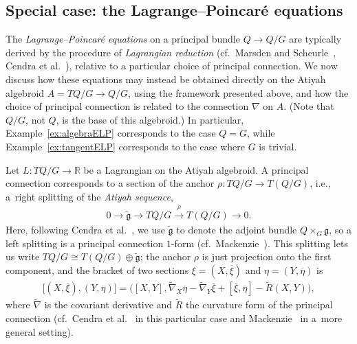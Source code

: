 \documentclass[pdftex]{sigma}
\numberwithin{equation}{section}
\begin{document}
\subsection{Special case: the Lagrange--Poincar\'e equations} \label{sec:lagrangePoincare}

The \emph{Lagrange--Poincar\'e equations} on a principal bundle $ Q \rightarrow Q / G $ are typically derived by the procedure of \emph{Lagrangian reduction} (cf.\ Marsden and Scheurle~\cite{MaSc1993b}, Cendra et al.~\cite{CeMaRa2001}), relative to a particular choice of principal connection. We now discuss how these equations may instead be obtained directly on the Atiyah algebroid $ A = T Q / G \rightarrow Q / G $, using the framework presented above, and how the choice of principal connection is related to the connection $ \nabla $ on $A$. (Note that $ Q / G $, not $Q$, is the base of this algebroid.) In particular,
Example~\ref{ex:algebraELP} corresponds to the case $ Q = G $, while Example~\ref{ex:tangentELP} corresponds to the case where $G$ is trivial.

Let $ L \colon T Q / G \rightarrow \mathbb{R} $ be a Lagrangian on the Atiyah algebroid. A principal connection corresponds to a section of the anchor $ \rho \colon T Q / G \rightarrow T ( Q / G ) $, i.e., a~right splitting of the \emph{Atiyah sequence},
\begin{gather} \label{eqn:atiyahSequence}
 0 \rightarrow \widetilde{ \mathfrak{g} } \rightarrow T Q / G \xrightarrow{ \rho } T ( Q / G ) \rightarrow 0 .
 \end{gather}
Here, following Cendra et al.~\cite{CeMaRa2001}, we use $ \widetilde{ \mathfrak{g} } $ to denote the adjoint bundle $ Q \times _G \mathfrak{g} $, so a left splitting is a principal connection $1$-form (cf.\ Mackenzie~\cite[Chapter~5]{Mackenzie2005}). This splitting lets us write $ T Q / G \cong T ( Q / G ) \oplus \widetilde{ \mathfrak{g} } $; the anchor $\rho$ is just projection onto the f\/irst component, and the bracket of two sections $ \xi = ( X, \overline{ \xi } ) $ and $ \eta = ( Y , \overline{ \eta } ) $ is
 \begin{gather} \label{eqn:atiyahBracket}
 \bigl[ ( X, \overline{ \xi } ) , ( Y , \overline{ \eta } ) \bigr] = \bigl( [X, Y ] , \widetilde{ \nabla } _X \overline{ \eta } - \widetilde{ \nabla } _Y \overline{ \xi } + [ \overline{ \xi } , \overline{ \eta } ] - \widetilde{ R } ( X, Y ) \bigr) ,
 \end{gather}
 where $ \widetilde{ \nabla } $ is the covariant derivative and $ \widetilde{ R } $ the curvature form of the principal connection (cf.\ Cendra et al.~\cite[Theorem~5.2.4]{CeMaRa2001} in this particular case and Mackenzie~\cite[Theorem~7.3.7]{Mackenzie2005} in a~more general setting).
\end{document}
